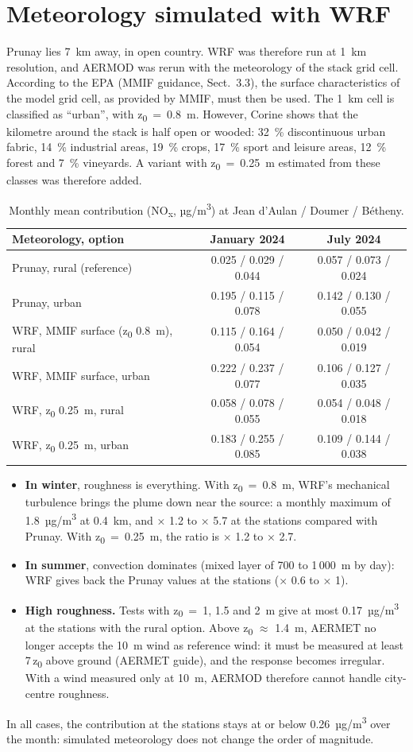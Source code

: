 \documentclass[11pt,a4paper]{article}
\newcommand{\NOx}{NO\textsubscript{x}}
\newcommand{\ugm}{µg/m\textsuperscript{3}}
\newcommand{\zz}{z\textsubscript{0}}
\begin{document}
\section{Meteorology simulated with WRF}
Prunay lies 7~km away, in open country. WRF was therefore run at 1~km resolution, and AERMOD was rerun with the
meteorology of the stack grid cell. According to the EPA (MMIF guidance, Sect.~3.3), the surface characteristics of
the model grid cell, as provided by MMIF, must then be used. The 1~km cell is classified as ``urban'', with
\zz{}~=~0.8~m. However, Corine shows that the kilometre around the stack is half open or wooded: 32~\% discontinuous
urban fabric, 14~\% industrial areas, 19~\% crops, 17~\% sport and leisure areas, 12~\% forest and 7~\% vineyards. A
variant with \zz{}~=~0.25~m estimated from these classes was therefore added.

\begin{table}[htbp]
\centering\small
\caption{Monthly mean contribution (\NOx, \ugm) at Jean d'Aulan / Doumer / Bétheny.}
\begin{tabular}{lcc}
\toprule
Meteorology, option & January 2024 & July 2024 \\
\midrule
Prunay, rural (reference) & 0.025 / 0.029 / 0.044 & 0.057 / 0.073 / 0.024 \\
Prunay, urban & 0.195 / 0.115 / 0.078 & 0.142 / 0.130 / 0.055 \\
WRF, MMIF surface (\zz{} 0.8~m), rural & 0.115 / 0.164 / 0.054 & 0.050 / 0.042 / 0.019 \\
WRF, MMIF surface, urban & 0.222 / 0.237 / 0.077 & 0.106 / 0.127 / 0.035 \\
WRF, \zz{} 0.25~m, rural & 0.058 / 0.078 / 0.055 & 0.054 / 0.048 / 0.018 \\
WRF, \zz{} 0.25~m, urban & 0.183 / 0.255 / 0.085 & 0.109 / 0.144 / 0.038 \\
\bottomrule
\end{tabular}
\end{table}

\begin{itemize}
\item \textbf{In winter}, roughness is everything. With \zz{}~=~0.8~m, WRF's mechanical turbulence brings the plume
down near the source: a monthly maximum of 1.8~\ugm{} at 0.4~km, and × 1.2 to × 5.7 at the stations compared with
Prunay. With \zz{}~=~0.25~m, the ratio is × 1.2 to × 2.7.
\item \textbf{In summer}, convection dominates (mixed layer of 700 to 1\,000~m by day): WRF gives back the Prunay
values at the stations (× 0.6 to × 1).
\item \textbf{High roughness.} Tests with \zz{}~=~1, 1.5 and 2~m give at most 0.17~\ugm{} at the stations with the
rural option. Above \zz{} $\approx$ 1.4~m, AERMET no longer accepts the 10~m wind as reference wind: it must be
measured at least 7\,\zz{} above ground (AERMET guide), and the response becomes irregular. With a wind measured
only at 10~m, AERMOD therefore cannot handle city-centre roughness.
\end{itemize}
In all cases, the contribution at the stations stays at or below 0.26~\ugm{} over the month: simulated meteorology
does not change the order of magnitude.
\end{document}
